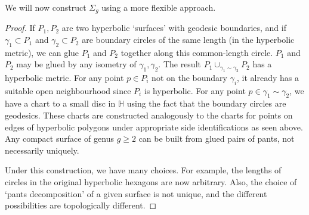 We will now construct $\Sigma_g$ using a more flexible approach.
\begin{proof}
	If $P_1, P_2$ are two hyperbolic `surfaces' with geodesic boundaries, and if $\gamma_1 \subset P_1$ and $\gamma_2 \subset P_2$ are boundary circles of the same length (in the hyperbolic metric), we can glue $P_1$ and $P_2$ together along this common-length circle.
	$P_1$ and $P_2$ may be glued by any isometry of $\gamma_1, \gamma_2$.
	The result $P_1 \cup_{\gamma_1 \sim \gamma_2} P_2$ has a hyperbolic metric.
	For any point $p \in P_i$ not on the boundary $\gamma_i$, it already has a suitable open neighbourhood since $P_i$ is hyperbolic.
	For any point $p \in \gamma_1 \sim \gamma_2$, we have a chart to a small disc in $\mathbb H$ using the fact that the boundary circles are geodesics.
	These charts are constructed analogously to the charts for points on edges of hyperbolic polygons under appropriate side identifications as seen above.
	Any compact surface of genus $g \geq 2$ can be built from glued pairs of pants, not necessarily uniquely.

	Under this construction, we have many choices.
	For example, the lengths of circles in the original hyperbolic hexagons are now arbitrary.
	Also, the choice of `pants decomposition' of a given surface is not unique, and the different possibilities are topologically different.
\end{proof}

